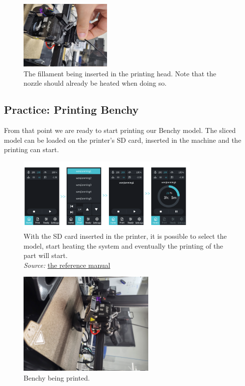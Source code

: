 \documentclass[a4paper,11pt]{article}
\begin{document}
\begin{figure}[H]
    \centering 
    \includegraphics[width=0.4\textwidth]{img/ender/8.jpg} 
    \caption{The fillament being inserted in the printing head. Note that the nozzle should already be heated when doing so.}
    \label{fig:ender8}
\end{figure}


\subsection{Practice: Printing Benchy}
From that point we are ready to start printing our Benchy model.
The sliced model can be loaded on the printer's SD card, inserted in the machine and the printing can start.
\label{sec:org72afed1}
\begin{figure}[H]
    \centering 
    \includegraphics[width=0.8\textwidth]{img/ender/8a.png} 
    \caption{With the SD card inserted in the printer, it is possible to select the model, start heating the system and eventually the printing of the part will start.\\
    \textit{Source:} \href{https://img.staticdj.com/8f39f619af6bf34e5afb36ddbf2a0229.pdf?spm=..page\_1995605.download\_support\_1.1\&spm\_prev=..product\_5e45abfb-4541-4c92-ba93-cfba9a1e3ea4.nav\_link\_store\_1.1}{the reference manual}}
    \label{fig:ender8a}
\end{figure}

\begin{figure}[H]
    \centering 
    \includegraphics[width=0.6\textwidth]{img/ender/9.jpg} 
    \caption{Benchy being printed.}
    \label{fig:ender9}
\end{figure}
\end{document}

